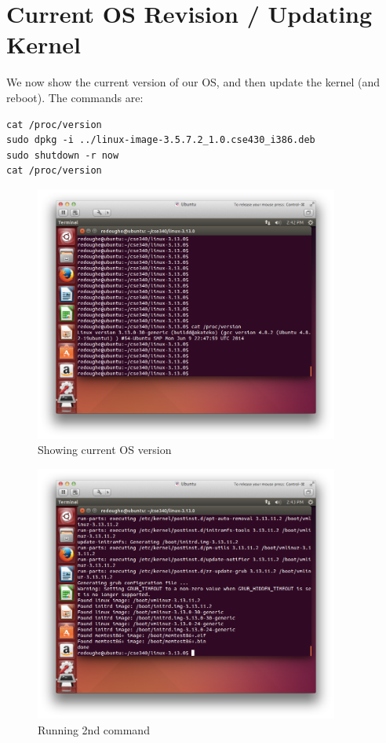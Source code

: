 \documentclass[12pt]{article}
\newcommand{\imagesize}{100mm}
\begin{document}
\section{Current OS Revision / Updating Kernel}
We now show the current version of our OS, and then update the kernel (and reboot). The commands are:

\begin{verbatim}
cat /proc/version
sudo dpkg -i ../linux-image-3.5.7.2_1.0.cse430_i386.deb
sudo shutdown -r now
cat /proc/version
\end{verbatim}

\begin{figure}
\centering
\includegraphics[width=\imagesize]{9.jpg}
\caption{Showing current OS version}
\end{figure}

\begin{figure}
\centering
\includegraphics[width=\imagesize]{10.jpg}
\caption{Running 2nd command}
\end{figure}
\end{document}
